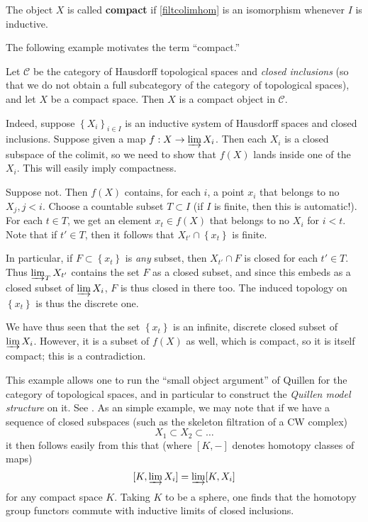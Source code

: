 \begin{definition} 
The object $X$ is called \textbf{compact} if \eqref{filtcolimhom} is an
isomorphism whenever $I$ is inductive.
\end{definition} 
The following example motivates the term ``compact.''
\begin{example} 
Let $\mathcal{C}$ be the category of Hausdorff topological spaces and
\emph{closed inclusions} (so that we do not obtain a full subcategory of the
category of topological spaces), and let $X$
be a compact space. Then $X$ is a compact object in $\mathcal{C}$.

Indeed, suppose $\left\{X_i\right\}_{i \in I}$ is an inductive system of
Hausdorff spaces and closed inclusions. Suppose given a map $f:X \to \varinjlim
X_i$. Then each $X_i$ is a closed subspace of the colimit, so we need to show that
$f(X)$ lands inside one of the $X_i$. This will easily imply compactness.

Suppose not. Then $f(X)$ contains, for each $i$, a point $x_i$ that belongs to
no $X_j, j < i$. Choose a countable subset $T \subset I$ (if $I$ is finite,
then this is automatic!). For each $t \in T$, we get an element $x_t \in
f(X)$ that belongs to no $X_i$ for $i < t$. Note that if $t' \in T$, then it
follows that $X_{t'} \cap \left\{x_t\right\}$ is finite.


In particular, if $F \subset \left\{x_t\right\}$ is \emph{any} subset, then
$X_{t'} \cap F$ is closed  for each $t' \in T$.
Thus $\varinjlim_T X_{t'}$ contains the set $F$ as a closed
subset, and since this embeds as a closed subset of $\varinjlim X_i$,  $F$ is
thus closed in there too.
The induced topology on $\left\{x_t\right\}$ is thus the discrete one.

We have thus seen that the set $\left\{x_t\right\}$ is an infinite, discrete
closed subset of $\varinjlim X_i$. However, it is a subset of $f(X)$ as well,
which is compact, so it is itself compact; this is a contradiction.

This example allows one to run the ``small object argument'' of Quillen for
the category of topological spaces, and in particular to construct the
\emph{Quillen model structure} on it. See \cite{Ho07}. As an simple example,
we may note that if we have a sequence of closed subspaces (such as the
skeleton filtration of a CW complex)
\[ X_1 \subset X_2 \subset \dots  \]
it then follows easily from this that  (where $[K, -]$ denotes homotopy
classes of maps)
\[ [K, \varinjlim X_i]  = \varinjlim [K, X_i]  \]
for any compact space $K$. Taking $K$ to be a sphere, one finds that the
homotopy group functors commute with inductive limits of closed inclusions.
\end{example} 



